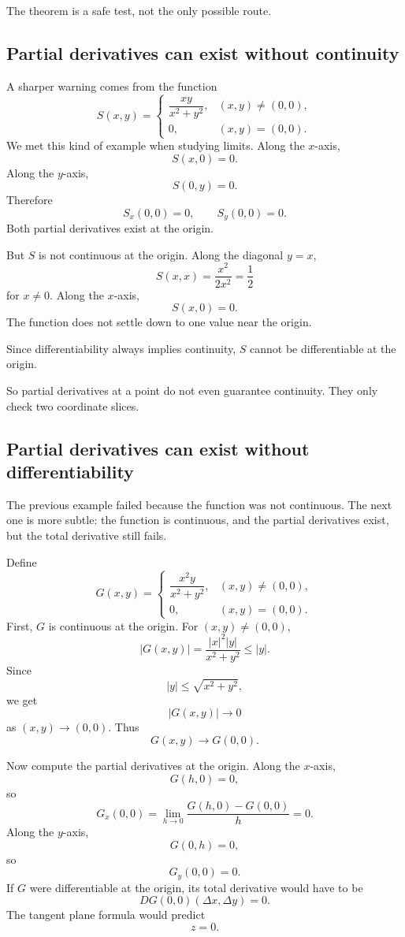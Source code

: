 The theorem is a safe test, not the only possible route.

\subsection{Partial derivatives can exist without continuity}

A sharper warning comes from the function
\[
    S(x,y)=
    \begin{cases}
    \dfrac{xy}{x^2+y^2}, & (x,y)\ne(0,0),\\[2mm]
    0, & (x,y)=(0,0).
    \end{cases}
\]
We met this kind of example when studying limits.  Along the \(x\)-axis,
\[
    S(x,0)=0.
\]
Along the \(y\)-axis,
\[
    S(0,y)=0.
\]
Therefore
\[
    S_x(0,0)=0,
    \qquad
    S_y(0,0)=0.
\]
Both partial derivatives exist at the origin.

But \(S\) is not continuous at the origin.  Along the diagonal \(y=x\),
\[
    S(x,x)=\frac{x^2}{2x^2}=\frac12
\]
for \(x\ne0\).  Along the \(x\)-axis,
\[
    S(x,0)=0.
\]
The function does not settle down to one value near the origin.

Since differentiability always implies continuity, \(S\) cannot be differentiable at the
origin.

So partial derivatives at a point do not even guarantee continuity.  They only check
two coordinate slices.

\subsection{Partial derivatives can exist without differentiability}

The previous example failed because the function was not continuous.  The next one is
more subtle: the function is continuous, and the partial derivatives exist, but the total
derivative still fails.

Define
\[
    G(x,y)=
    \begin{cases}
    \dfrac{x^2y}{x^2+y^2}, & (x,y)\ne(0,0),\\[2mm]
    0, & (x,y)=(0,0).
    \end{cases}
\]
First, \(G\) is continuous at the origin.  For \((x,y)\ne(0,0)\),
\[
    |G(x,y)|
    =
    \frac{|x|^2|y|}{x^2+y^2}
    \le
    |y|.
\]
Since
\[
    |y|\le \sqrt{x^2+y^2},
\]
we get
\[
    |G(x,y)|\to0
\]
as \((x,y)\to(0,0)\).  Thus
\[
    G(x,y)\to G(0,0).
\]

Now compute the partial derivatives at the origin.  Along the \(x\)-axis,
\[
    G(h,0)=0,
\]
so
\[
    G_x(0,0)=
    \lim_{h\to0}\frac{G(h,0)-G(0,0)}{h}
    =
    0.
\]
Along the \(y\)-axis,
\[
    G(0,h)=0,
\]
so
\[
    G_y(0,0)=0.
\]
If \(G\) were differentiable at the origin, its total derivative would have to be
\[
    DG(0,0)(\Delta x,\Delta y)=0.
\]
The tangent plane formula would predict
\[
    z=0.
\]

